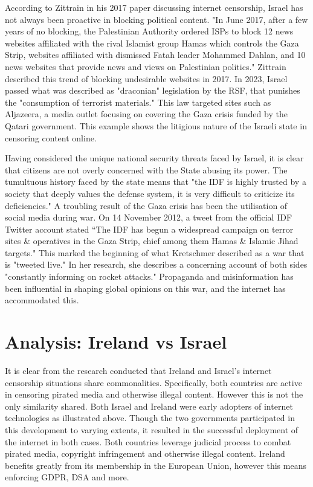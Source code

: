 According to Zittrain in his 2017 paper discussing internet censorship, Israel has not always been proactive in blocking political content. "In June 2017, after a few years of no blocking, the Palestinian Authority ordered ISPs to block 12 news websites affiliated with the rival Islamist group Hamas which controls the Gaza Strip, websites affiliated with dismissed Fatah leader Mohammed Dahlan, and 10 news websites that provide news and views on Palestinian politics." \cite{zittrain2017shifting} Zittrain described this trend of blocking undesirable websites in 2017. In 2023, Israel passed what was described as "draconian" legislation by the RSF, that punishes the "consumption of terrorist materials." \cite{RSF2024IsraelCensorship} This law targeted sites such as Aljazeera, a media outlet focusing on covering the Gaza crisis funded by the Qatari government. \cite{AlJazeera2023Knesset} This example shows the litigious nature of the Israeli state in censoring content online. 

Having considered the unique national security threats faced by Israel, it is clear that citizens are not overly concerned with the State abusing its power. The tumultuous history faced by the state means that "the IDF is highly trusted by a society that deeply values the defense system, it is very difficult to criticize its deficiencies." \cite{MAGEN2018287} A troubling result of the Gaza crisis has been the utilisation of social media during war. On 14 November 2012, a tweet from the official IDF Twitter account stated “The IDF has begun a widespread campaign on terror sites \& operatives in the
Gaza Strip, chief among them Hamas \& Islamic Jihad targets." \cite{IDF_Twitter} This marked the beginning of what Kretschmer described as a war that is "tweeted live." In her research, she describes a concerning account of both sides "constantly informing on rocket attacks." \cite {Kretschmer_2017} Propaganda and misinformation has been influential in shaping global opinions on this war, and the internet has accommodated this.

\section{Analysis: Ireland vs Israel}
It is clear from the research conducted that Ireland and Israel's internet censorship situations share commonalities. Specifically, both countries are active in censoring pirated media and otherwise illegal content. However this is not the only similarity shared. Both Israel and Ireland were early adopters of internet technologies as illustrated above. Though the two governments participated in this development to varying extents, it resulted in the successful deployment of the internet in both cases. Both countries leverage judicial process to combat pirated media, copyright infringement and otherwise illegal content. Ireland benefits greatly from its membership in the European Union, however this means enforcing GDPR, DSA and more.
